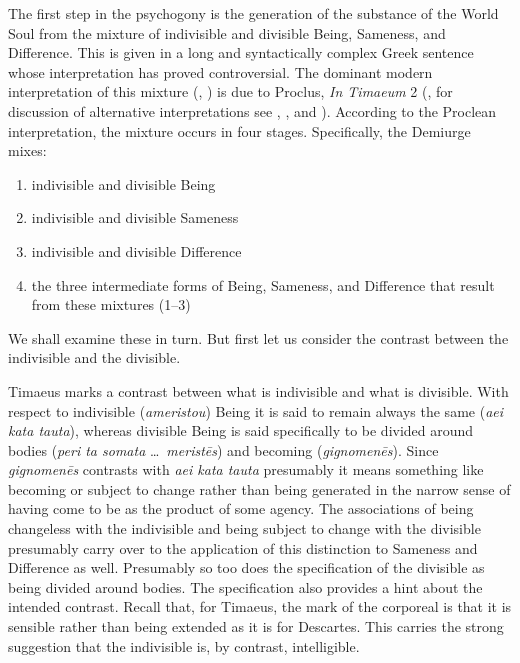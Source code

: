 The first step in the psychogony is the generation of the substance of the World Soul from the mixture of indivisible and divisible Being, Sameness, and Difference. This is given in a long and syntactically complex Greek sentence whose interpretation has proved controversial. The dominant modern interpretation of this mixture (\citealt{Grube:1932qr}, \citealt[60--1]{Cornford:1935fk} \citealt[70--1]{Robinson:1970lq}) is due to Proclus, \emph{In Timaeum} 2 (\citealt{Diehl:1903re}, for discussion of alternative interpretations see \citealt[106--36]{Taylor:1928qb}, \citealt[51--54]{Shorey:1889sx}, and \citealt[352]{Shorey:1928ar}). According to the Proclean interpretation, the mixture occurs in four stages. Specifically, the Demiurge mixes:
\begin{enumerate}[(1)]
	\item indivisible and divisible Being
	\item indivisible and divisible Sameness
	\item indivisible and divisible Difference
	\item the three intermediate forms of Being, Sameness, and Difference that result from these mixtures (1--3)
\end{enumerate} 
We shall examine these in turn. But first let us consider the contrast between the indivisible and the divisible.

Timaeus marks a contrast between what is indivisible and what is divisible. With respect to indivisible (\emph{ameristou}) Being it is said to remain always the same (\emph{aei kata tauta}), whereas divisible Being is said specifically to be divided around bodies (\emph{peri ta somata} \ldots\ \emph{meristēs}) and becoming (\emph{gignomenēs}). Since \emph{gignomenēs} contrasts with \emph{aei kata tauta} presumably it means something like becoming or subject to change rather than being generated in the narrow sense of having come to be as the product of some agency. The associations of being changeless with the indivisible and being subject to change with the divisible presumably carry over to the application of this distinction to Sameness and Difference as well. Presumably so too does the specification of the divisible as being divided around bodies. The specification also provides a hint about the intended contrast. Recall that, for Timaeus, the mark of the corporeal is that it is sensible rather than being extended as it is for Descartes. This carries the strong suggestion that the indivisible is, by contrast, intelligible.

